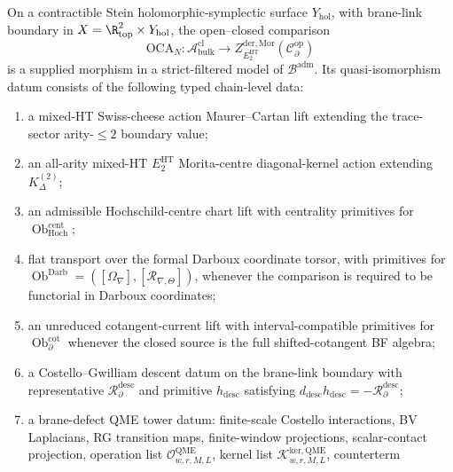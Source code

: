 \begin{thm}
\label{thm:contractible-stein-descent-criterion-HS}
On a contractible Stein holomorphic-symplectic surface
\(Y_{\mathrm{hol}}\), with brane-link boundary in
\(X=\R^2_{\mathrm{top}}\times Y_{\mathrm{hol}}\), the open--closed
comparison
\[
  \mathrm{OCA}_N\colon
    \mathcal A^{\mathrm{cl}}_{\mathrm{bulk}}
    \longrightarrow
    Z^{\mathrm{der},\mathrm{Mor}}_{E_2^{\mathrm{HT}}}
      (\mathcal C^{\mathrm{op}}_\partial)
\]
is a supplied morphism in a strict-filtered model of
\(\mathcal B^{\mathrm{adm}}\).  Its quasi-isomorphism datum consists of
the following typed chain-level data:
\begin{enumerate}[label=\textup{(\roman*)}]
  \item a mixed-HT Swiss-cheese action Maurer--Cartan lift extending the
        trace-sector arity-\(\le2\) boundary value;
  \item an all-arity mixed-HT \(E_2^{\mathrm{HT}}\) Morita-centre
        diagonal-kernel action extending
        \(K^{(2)}_\Delta\);
  \item an admissible Hochschild-centre chart lift with centrality
        primitives for
        \(\operatorname{Ob}^{\mathrm{cent}}_{\mathrm{Hoch}}\);
  \item flat transport over the formal Darboux coordinate torsor, with
        primitives for
        \(\operatorname{Ob}^{\mathrm{Darb}}
        =([\Omega_\nabla],[\mathcal R_{\nabla,\Theta}])\), whenever the
        comparison is required to be functorial in Darboux coordinates;
  \item an unreduced cotangent-current lift with interval-compatible
        primitives for \(\operatorname{Ob}^{\mathrm{cot}}_\partial\)
        whenever the closed source is the full shifted-cotangent BF
        algebra;
  \item a Costello--Gwilliam descent datum on the brane-link boundary
        with representative
        \(\mathcal R^{\mathrm{desc}}_{\partial}\) and primitive
        \(h_{\mathrm{desc}}\) satisfying
        \(d_{\mathrm{desc}}h_{\mathrm{desc}}
        =-\mathcal R^{\mathrm{desc}}_{\partial}\);
  \item a brane-defect QME tower datum: finite-scale Costello
        interactions, BV Laplacians, RG transition maps, finite-window
        projections, scalar-contact projection, operation list
        \(\mathcal O^{\mathrm{QME}}_{w,r,M,L}\), kernel list
        \(\mathcal K^{\mathrm{ker,QME}}_{w,r,M,L}\), counterterm

\end{enumerate}
\end{thm}
